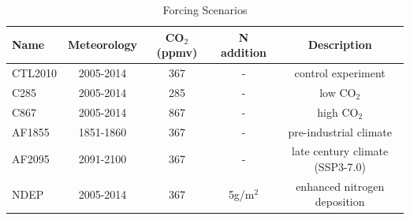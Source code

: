 \documentclass[draft]{agujournal2019}
\begin{document}
\label{sect:exps}
 \begin{table}[h]
 \caption{Forcing Scenarios}
 \centering
 \begin{tabular}{l c c c c}
 \hline
  Name  & Meteorology & CO$_2$ (ppmv) & N addition & Description \\
 \hline
   CTL2010  & 2005-2014 & 367 & - & control experiment\\
   C285        & 2005-2014 & 285 & - & low CO$_2$ \\
   C867        & 2005-2014 & 867 & - & high CO$_2$ \\
   AF1855    & 1851-1860 & 367 & - & pre-industrial climate \\
   AF2095    & 2091-2100 & 367 & - & late century climate (SSP3-7.0) \\
   NDEP      & 2005-2014 & 367 & 5g/m$^2$ & enhanced nitrogen deposition \\
 \hline
 \end{tabular}
 \label{tab:exps}
 \end{table}
\end{document}
